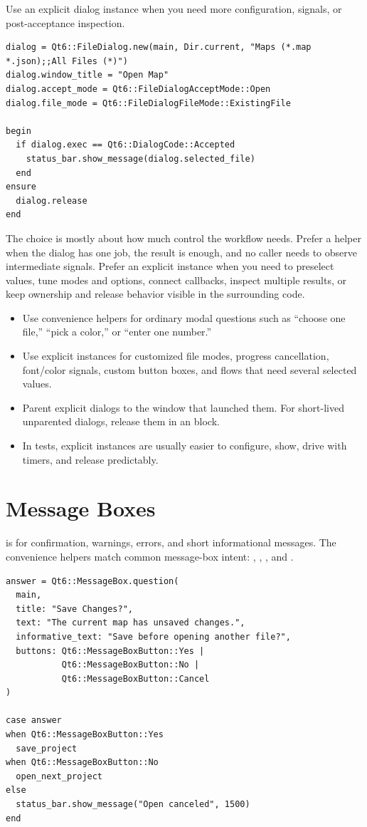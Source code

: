 Use an explicit dialog instance when you need more configuration, signals, or post-acceptance inspection.

\begin{lstlisting}[style=crystal]
dialog = Qt6::FileDialog.new(main, Dir.current, "Maps (*.map *.json);;All Files (*)")
dialog.window_title = "Open Map"
dialog.accept_mode = Qt6::FileDialogAcceptMode::Open
dialog.file_mode = Qt6::FileDialogFileMode::ExistingFile

begin
  if dialog.exec == Qt6::DialogCode::Accepted
    status_bar.show_message(dialog.selected_file)
  end
ensure
  dialog.release
end
\end{lstlisting}

The choice is mostly about how much control the workflow needs. Prefer a helper when the dialog has one job, the result is enough, and no caller needs to observe intermediate signals. Prefer an explicit instance when you need to preselect values, tune modes and options, connect callbacks, inspect multiple results, or keep ownership and release behavior visible in the surrounding code.

\begin{itemize}
\item Use convenience helpers for ordinary modal questions such as ``choose one file,'' ``pick a color,'' or ``enter one number.''
\item Use explicit instances for customized file modes, progress cancellation, font/color signals, custom button boxes, and flows that need several selected values.
\item Parent explicit dialogs to the window that launched them. For short-lived unparented dialogs, release them in an  block.
\item In tests, explicit instances are usually easier to configure, show, drive with timers, and release predictably.
\end{itemize}

\section{Message Boxes}

 is for confirmation, warnings, errors, and short informational messages. The convenience helpers match common message-box intent: , , , and .

\begin{lstlisting}[style=crystal]
answer = Qt6::MessageBox.question(
  main,
  title: "Save Changes?",
  text: "The current map has unsaved changes.",
  informative_text: "Save before opening another file?",
  buttons: Qt6::MessageBoxButton::Yes |
           Qt6::MessageBoxButton::No |
           Qt6::MessageBoxButton::Cancel
)

case answer
when Qt6::MessageBoxButton::Yes
  save_project
when Qt6::MessageBoxButton::No
  open_next_project
else
  status_bar.show_message("Open canceled", 1500)
end
\end{lstlisting}

